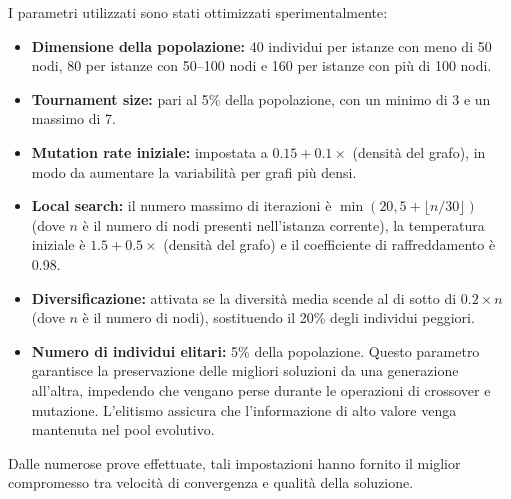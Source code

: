 \documentclass[12pt,a4paper,twoside]{article}
\begin{document}
\noindent I parametri utilizzati sono stati ottimizzati sperimentalmente:
\begin{itemize}[noitemsep, topsep=2pt]
    \item \textbf{Dimensione della popolazione:} 40 individui per istanze con meno di 50 nodi, 80 per istanze con 50--100 nodi e 160 per istanze con più di 100 nodi.
    \item \textbf{Tournament size:} pari al 5\% della popolazione, con un minimo di 3 e un massimo di 7.
    \item \textbf{Mutation rate iniziale:} impostata a \(0.15 + 0.1 \times\) (densità del grafo), in modo da aumentare la variabilità per grafi più densi.
    \item \textbf{Local search:} il numero massimo di iterazioni è \(\min(20, 5 + \lfloor n/30 \rfloor)\) (dove \(n\) è il numero di nodi presenti nell'istanza corrente), la temperatura iniziale è \(1.5 + 0.5 \times\) (densità del grafo) e il coefficiente di raffreddamento è 0.98.
    \item \textbf{Diversificazione:} attivata se la diversità media scende al di sotto di \(0.2 \times n\) (dove \(n\) è il numero di nodi), sostituendo il 20\% degli individui peggiori.
    \item \textbf{Numero di individui elitari:} 5\% della popolazione. Questo parametro garantisce la preservazione delle migliori soluzioni da una generazione all'altra, impedendo che vengano perse durante le operazioni di crossover e mutazione. L'elitismo assicura che l'informazione di alto valore venga mantenuta nel pool evolutivo.
\end{itemize}
Dalle numerose prove effettuate, tali impostazioni hanno fornito il miglior compromesso tra velocità di convergenza e qualità della soluzione.

\clearpage
\end{document}
